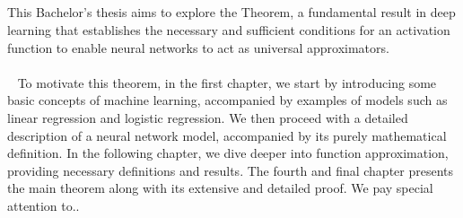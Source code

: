 \documentclass[../main.tex]{subfiles}
\begin{document}
\\ \\  \\ \\ 
This Bachelor's thesis aims to explore the \cite{leshno1993multilayer} Theorem, a fundamental result in deep learning that establishes the necessary and sufficient conditions for an activation function to enable neural networks to act as universal approximators. 
\\ \\ 
To motivate this theorem, in the first chapter, we start by introducing some basic concepts of machine learning, accompanied by examples of models such as linear regression and logistic regression. We then proceed with a detailed description of a neural network model, accompanied by its purely mathematical definition. In the following chapter, we dive deeper into function approximation, providing necessary definitions and results. The fourth and final chapter presents the main theorem along with its extensive and detailed proof. We pay special attention to..
\end{document}
